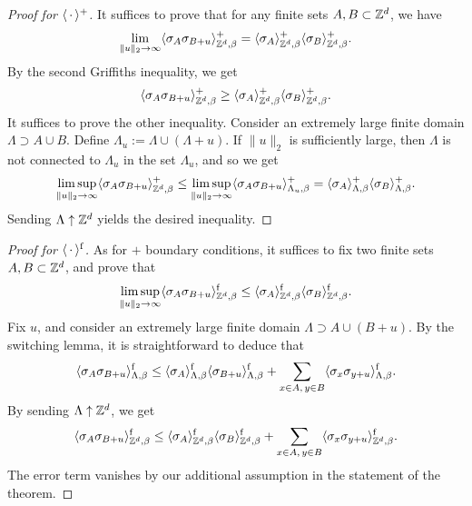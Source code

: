 \begin{proof}[Proof for $\langle\,\cdot\,\rangle^+$]
    It suffices to prove that for any finite sets $A,B\subset\mathbb Z^d$,
    we have
    \[
        \lim_{\|u\|_2\to\infty}
        \langle\sigma_A\sigma_{B+u}\rangle_{\mathbb Z^d,\beta}^+
        =
        \langle\sigma_A\rangle_{\mathbb Z^d,\beta}^+
        \langle\sigma_B\rangle_{\mathbb Z^d,\beta}^+.
    \]
    By the second Griffiths inequality,
    we get
    \[
        \langle\sigma_A\sigma_{B+u}\rangle_{\mathbb Z^d,\beta}^+
        \geq
        \langle\sigma_A\rangle_{\mathbb Z^d,\beta}^+
        \langle\sigma_B\rangle_{\mathbb Z^d,\beta}^+.
    \]
    It suffices to prove the other inequality.
    Consider an extremely large finite domain $\Lambda\supset A\cup B$.
    Define $\Lambda_u:=\Lambda\cup(\Lambda+u)$.
    If $\|u\|_2$ is sufficiently large,
    then $\Lambda$ is not connected to $\Lambda_u$
    in the set $\Lambda_u$, and so we get
    \[
        \limsup_{\|u\|_2\to\infty}
        \langle\sigma_A\sigma_{B+u}\rangle_{\mathbb Z^d,\beta}^+
        \leq
        \limsup_{\|u\|_2\to\infty}
        \langle\sigma_A\sigma_{B+u}\rangle_{\Lambda_u,\beta}^+
        =
        \langle\sigma_A\rangle_{\Lambda,\beta}^+
        \langle\sigma_B\rangle_{\Lambda,\beta}^+
        .
    \]
    Sending $\Lambda\uparrow\mathbb Z^d$ yields the desired inequality.
\end{proof}

\begin{proof}[Proof for $\langle\,\cdot\,\rangle^{\operatorname{f}}$]
    As for $+$ boundary conditions,
    it suffices to fix two finite sets $A,B\subset\mathbb Z^d$,
    and prove that
    \[
        \limsup_{\|u\|_2\to\infty}
        \langle\sigma_A\sigma_{B+u}\rangle_{\mathbb Z^d,\beta}^{\operatorname{f}}
        \leq
        \langle\sigma_A\rangle_{\mathbb Z^d,\beta}^{\operatorname{f}}
        \langle\sigma_B\rangle_{\mathbb Z^d,\beta}^{\operatorname{f}}
        .
    \]
    Fix $u$, and
    consider an extremely large finite domain $\Lambda\supset A\cup (B+u)$.
    By the switching lemma, it is straightforward to deduce that
    \[
        \langle\sigma_A\sigma_{B+u}\rangle_{\Lambda,\beta}^{\operatorname{f}}
        \leq
        \langle\sigma_A\rangle_{\Lambda,\beta}^{\operatorname{f}}\langle\sigma_{B+u}\rangle_{\Lambda,\beta}^{\operatorname{f}}
        +\sum_{x\in A,\,y\in B}\langle\sigma_x\sigma_{y+u}\rangle_{\Lambda,\beta}^{\operatorname{f}}.
    \]
    By sending $\Lambda\uparrow\mathbb Z^d$, we get
    \[
        \langle\sigma_A\sigma_{B+u}\rangle_{\mathbb Z^d,\beta}^{\operatorname{f}}
        \leq
        \langle\sigma_A\rangle_{\mathbb Z^d,\beta}^{\operatorname{f}}\langle\sigma_B\rangle_{\mathbb Z^d,\beta}^{\operatorname{f}}
        +\sum_{x\in A,\,y\in B}\langle\sigma_x\sigma_{y+u}\rangle_{\mathbb Z^d,\beta}^{\operatorname{f}}.
    \]
    The error term vanishes by our additional assumption in the statement of the theorem.
\end{proof}
